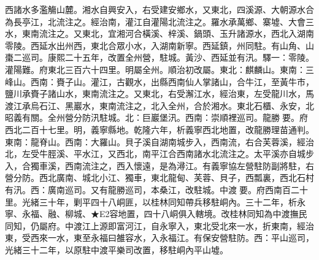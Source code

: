 \begin{pinyinscope}
西諸水多濫觴山麓。湘水自興安入，右受建安鄉水，又東北，四溪源、大朝源水合為長亭江，北流注之。經治南，灌江自灌陽北流注之。羅水承萬鄉、寨墟、大會三水，東南流注之。又東北，宜湘河合橫溪、梓溪、鍋頭、玉升諸源水，西北入湖南零陵。西延水出州西，東北合眾小水，入湖南新寧。西延鎮，州同駐。有山角、山棗二巡司。康熙二十五年，改置全州營，駐城。黃沙、西延並有汛。驛一：零陵。灌陽難。府東北三百六十四里。明屬全州。順治初改屬。東北：麒麟山。東南：三峰山。西南：賚子山。灌江，古觀水，出縣西南仙人掌諸山，合牛江，至黃牛市，鹽川承賚子諸山水，東南流注之。又東北，右受澥江水，經治東，左受龍川水，馬渡江承烏石江、黑巖水，東南流注之，北入全州，合於湘水。東北石櫃、永安，北昭義有關。全州營分防汛駐城。北：巨巖堡汛。西南：崇順裡巡司。龍勝要。府西北二百十七里。明，義寧縣地。乾隆六年，析義寧西北地置，改龍勝理苗通判。東南：龍脊山。西南：大羅山。貝子溪自湖南城步入，西南流，右合芙蓉溪，經治北，左受牛脛溪、平水江，又西北，南平江合西南諸水北流注之。太平溪亦自城步入，合獨車溪，西南流注之，西入懷遠，是為潯江。有義寧協左營駐防副將駐，右營分防。西北廣南、城北小江、獨車，東北龍甸、芙蓉、貝子，西瓢裏，西北石村有汛。西：廣南巡司。又有龍勝巡司，本桑江，改駐城。中渡要。府西南百二十里。光緒三十年，剿平四十八峒匪，以桂林同知帶兵移駐峒內。三十二年，析永寧、永福、融、柳城、★E2容地置，四十八峒俱入轄境。改桂林同知為中渡撫民同知，仍屬府。中渡江上源即富河江，自永寧入，東北受北來一水，折東南，經治東，受西來一水，東至永福曰雒容水，入永福江。有保安營駐防。西：平山巡司，光緒三十二年，以原駐中渡平樂司改置，移駐峒內平山墟。


\end{pinyinscope}
